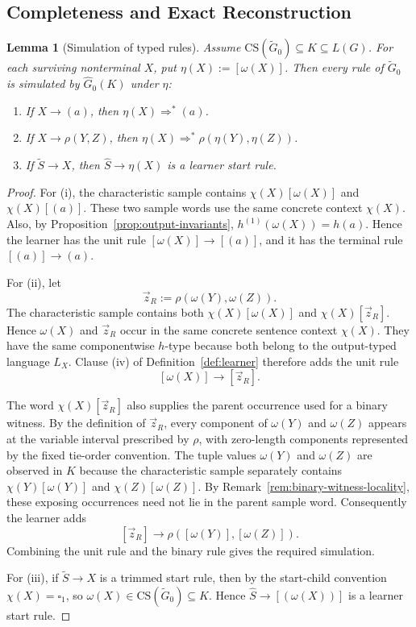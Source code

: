 \documentclass[11pt,a4paper]{article}
\newtheorem{lemma}[theorem]{Lemma}
\theoremstyle{remark}
\newcommand{\CS}{\mathrm{CS}}
\newcommand{\tuple}[1]{\vec{#1}}
\newcommand{\blank}{\square}
\begin{document}
\subsection{Completeness and Exact Reconstruction}
\label{sec:completeness}

\begin{lemma}[Simulation of typed rules]
\label{lem:rule-simulation}
Assume \(\CS(\widetilde G_0)\subseteq K\subseteq L(G)\).  For each surviving
nonterminal \(X\), put \(\eta(X):=[\omega(X)]\).  Then every rule of
\(\widetilde G_0\) is simulated by \(\widehat G_0(K)\) under \(\eta\):
\begin{enumerate}[label=(\roman*),leftmargin=*]
\item If \(X\to(a)\), then \(\eta(X)\Rightarrow^*(a)\).
\item If \(X\to\rho(Y,Z)\), then
\(\eta(X)\Rightarrow^*\rho(\eta(Y),\eta(Z))\).
\item If \(\widetilde S\to X\), then \(\widehat S\to\eta(X)\) is a learner
start rule.
\end{enumerate}
\end{lemma}

\begin{proof}
For (i), the characteristic sample contains \(\chi(X)[\omega(X)]\) and
\(\chi(X)[(a)]\).  These two sample words use the same concrete context
\(\chi(X)\).  Also, by Proposition~\ref{prop:output-invariants},
\(h^{(1)}(\omega(X))=h(a)\).  Hence the learner has the unit rule
\([\omega(X)]\to[(a)]\), and it has the terminal rule \([(a)]\to(a)\).

For (ii), let
\[
  \tuple z_R:=\rho(\omega(Y),\omega(Z)).
\]
The characteristic sample contains both
\(\chi(X)[\omega(X)]\) and \(\chi(X)[\tuple z_R]\).  Hence
\(\omega(X)\) and \(\tuple z_R\) occur in the same concrete sentence context
\(\chi(X)\).  They have the same componentwise \(h\)-type because both belong
to the output-typed language \(L_X\).  Clause (iv) of
Definition~\ref{def:learner} therefore adds the unit rule
\[
  [\omega(X)]\to[\tuple z_R].
\]

The word \(\chi(X)[\tuple z_R]\) also supplies the parent occurrence used for
a binary witness.  By the definition of \(\tuple z_R\), every component of
\(\omega(Y)\) and \(\omega(Z)\) appears at the variable interval prescribed by
\(\rho\), with zero-length components represented by the fixed tie-order
convention.  The tuple values \(\omega(Y)\) and \(\omega(Z)\) are observed in
\(K\) because the characteristic sample separately contains
\(\chi(Y)[\omega(Y)]\) and \(\chi(Z)[\omega(Z)]\).  By
Remark~\ref{rem:binary-witness-locality}, these exposing occurrences need not
lie in the parent sample word.  Consequently the learner adds
\[
  [\tuple z_R]\to\rho([\omega(Y)],[\omega(Z)]).
\]
Combining the unit rule and the binary rule gives the required simulation.

For (iii), if \(\widetilde S\to X\) is a trimmed start rule, then by the
start-child convention \(\chi(X)=\blank_1\), so \(\omega(X)\in\CS(\widetilde
G_0)\subseteq K\).  Hence \(\widehat S\to[(\omega(X))]\) is a learner start
rule.
\end{proof}
\end{document}
